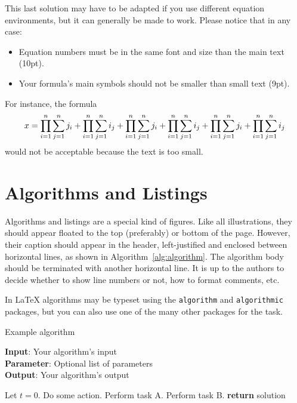 \documentclass{article}
\begin{document}
This last solution may have to be adapted if you use different equation environments, but it can generally be made to work. Please notice that in any case:

\begin{itemize}
    \item Equation numbers must be in the same font and size than the main text (10pt).
    \item Your formula's main symbols should not be smaller than {\small small} text (9pt).
\end{itemize}

For instance, the formula
%
\begin{equation}
    \resizebox{.91\linewidth}{!}{$
    \displaystyle
    x = \prod_{i=1}^n \sum_{j=1}^n j_i + \prod_{i=1}^n \sum_{j=1}^n i_j + \prod_{i=1}^n \sum_{j=1}^n j_i + \prod_{i=1}^n \sum_{j=1}^n i_j + \prod_{i=1}^n \sum_{j=1}^n j_i + \prod_{i=1}^n \sum_{j=1}^n i_j
$}
\end{equation}
% 
would not be acceptable because the text is too small.

\section{Algorithms and Listings}

Algorithms and listings are a special kind of figures. Like all illustrations, they should appear floated to the top (preferably) or bottom of the page. However, their caption should appear in the header, left-justified and enclosed between horizontal lines, as shown in Algorithm~\ref{alg:algorithm}. The algorithm body should be terminated with another horizontal line. It is up to the authors to decide whether to show line numbers or not, how to format comments, etc.

In \LaTeX{} algorithms may be typeset using the {\tt algorithm} and {\tt algorithmic} packages, but you can also use one of the many other packages for the task.  

\begin{algorithm}[tb]
\caption{Example algorithm}
\label{alg:algorithm}
\textbf{Input}: Your algorithm's input\\
\textbf{Parameter}: Optional list of parameters\\
\textbf{Output}: Your algorithm's output
\begin{algorithmic}[1] %
\STATE Let $t=0$.
\STATE Do some action.
\STATE Perform task A.
\ELSE
\STATE Perform task B.
\ENDIF
\ENDWHILE
\STATE \textbf{return} solution
\end{algorithmic}
\end{algorithm}
\end{document}
